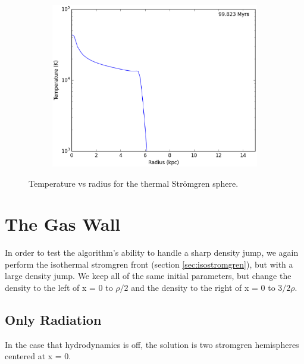 \begin{figure}
        ~
        \begin{subfigure}[b]{0.3\textwidth}
                \includegraphics[width=\textwidth]{graphics/ifrontThermal6400200Tempprofile.eps}
                \label{fig:stromgrenthermal500}
        \end{subfigure}
        \caption[Temperature vs radius for the thermal Str\"omgren sphere.]{Temperature vs radius for the thermal Str\"omgren sphere.}
        \label{fig:stromgrenthermal}
\end{figure}

\section{The Gas Wall}
\label{sec:gaswall}

In order to test the algorithm's ability to handle a sharp density jump, we again perform the isothermal stromgren front (section \ref{sec:isostromgren}), but with a large density jump. We keep all of the same initial parameters, but change the density to the left of x = 0 to $\rho/2$ and the density to the right of x = 0 to $3/2 \rho$.

\subsection{Only Radiation}
\label{sec:gaswallradonly}

In the case that hydrodynamics is off, the solution is two stromgren hemispheres centered at x = 0.

